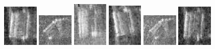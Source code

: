\begin{figure}
    \includegraphics[width=0.15\textwidth]{chapters/images/dataset/all-class-images/can/can-186.jpg}
    \includegraphics[width=0.15\textwidth]{chapters/images/dataset/all-class-images/can/can-50.jpg}
    \includegraphics[width=0.15\textwidth]{chapters/images/dataset/all-class-images/can/can-346.jpg}
    \includegraphics[width=0.15\textwidth]{chapters/images/dataset/all-class-images/can/can-121.jpg}
    \includegraphics[width=0.15\textwidth]{chapters/images/dataset/all-class-images/can/can-45.jpg}
    \includegraphics[width=0.15\textwidth]{chapters/images/dataset/all-class-images/can/can-170.jpg}
    

\end{figure}
